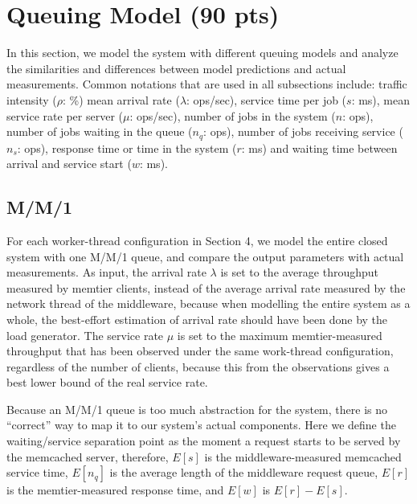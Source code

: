\section{Queuing Model (90 pts)}

In this section, we model the system with different queuing models and analyze the similarities and differences between model predictions and actual measurements. Common notations that are used in all subsections include: traffic intensity ($\rho$: \%) mean arrival rate ($\lambda$: ops/sec), service time per job ($s$: ms), mean service rate per server ($\mu$: ops/sec), number of jobs in the system ($n$: ops), number of jobs waiting in the queue ($n_q$: ops), number of jobs receiving service ($n_s$: ops), response time or time in the system ($r$: ms) and waiting time between arrival and service start ($w$: ms).

\subsection{M/M/1}

For each worker-thread configuration in Section 4, we model the entire closed system with one M/M/1 queue, and compare the output parameters with actual measurements. As input, the arrival rate $\lambda$ is set to the average throughput measured by memtier clients, instead of the average arrival rate measured by the network thread of the middleware, because when modelling the entire system as a whole, the best-effort estimation of arrival rate should have been done by the load generator. The service rate $\mu$ is set to the maximum memtier-measured throughput that has been observed under the same work-thread configuration, regardless of the number of clients, because this from the observations gives a best lower bound of the real service rate.

Because an M/M/1 queue is too much abstraction for the system, there is no ``correct'' way to map it to our system's actual components. Here we define the waiting/service separation point as the moment a request starts to be served by the memcached server, therefore, $E[s]$ is the middleware-measured memcached service time,
$E[n_q]$ is the average length of the middleware request queue,
$E[r]$ is the memtier-measured response time,
and $E[w]$ is $E[r]-E[s]$. 

